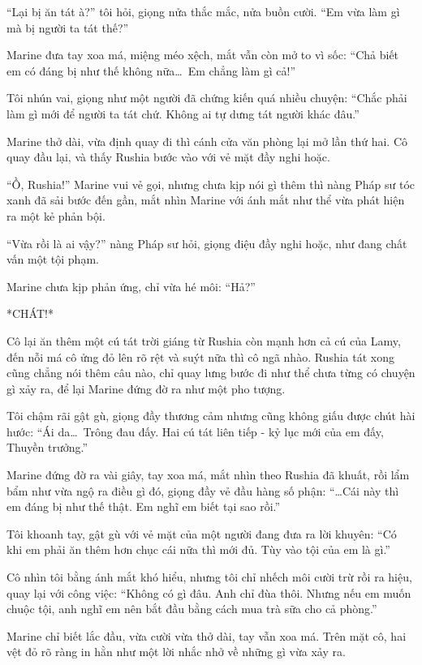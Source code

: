 \documentclass[../main.tex]{subfiles}
\begin{document}
``Lại bị ăn tát à?'' tôi hỏi, giọng nửa thắc mắc, nửa buồn cười. ``Em vừa làm gì mà bị người ta tát thế?''

Marine đưa tay xoa má, miệng méo xệch, mắt vẫn còn mở to vì sốc: ``Chả biết em có đáng bị như thế không nữa\dots\ Em chẳng làm gì cả!''

Tôi nhún vai, giọng như một người đã chứng kiến quá nhiều chuyện: ``Chắc phải làm gì mới để người ta tát chứ. Không ai tự dưng tát người khác đâu.''

Marine thở dài, vừa định quay đi thì cánh cửa văn phòng lại mở lần thứ hai. Cô quay đầu lại, và thấy Rushia bước vào với vẻ mặt đầy nghi hoặc.

``Ồ, Rushia!'' Marine vui vẻ gọi, nhưng chưa kịp nói gì thêm thì nàng Pháp sư tóc xanh đã sải bước đến gần, mắt nhìn Marine với ánh mắt như thể vừa phát hiện ra một kẻ phản bội.

``Vừa rồi là ai vậy?'' nàng Pháp sư hỏi, giọng điệu đầy nghi hoặc, như đang chất vấn một tội phạm.

Marine chưa kịp phản ứng, chỉ vừa hé môi: ``Hả?''

*CHÁT!*


Cô lại ăn thêm một cú tát trời giáng từ Rushia còn mạnh hơn cả cú của Lamy, đến nỗi má cô ửng đỏ lên rõ rệt và suýt nữa thì cô ngã nhào. Rushia tát xong cũng chẳng nói thêm câu nào, chỉ quay lưng bước đi như thể chưa từng có chuyện gì xảy ra, để lại Marine đứng đờ ra như một pho tượng.

Tôi chậm rãi gật gù, giọng đầy thương cảm nhưng cũng không giấu được chút hài hước: ``Ái da\dots\ Trông đau đấy. Hai cú tát liên tiếp - kỷ lục mới của em đấy, Thuyền trưởng.''

Marine đứng đờ ra vài giây, tay xoa má, mắt nhìn theo Rushia đã khuất, rồi lẩm bẩm như vừa ngộ ra điều gì đó, giọng đầy vẻ đầu hàng số phận: ``\dots  Cái này thì em đáng bị như thế thật. Em nghĩ em biết tại sao rồi.''


Tôi khoanh tay, gật gù với vẻ mặt của một người đang đưa ra lời khuyên: ``Có khi em phải ăn thêm hơn chục cái nữa thì mới đủ. Tùy vào tội của em là gì.''

Cô nhìn tôi bằng ánh mắt khó hiểu, nhưng tôi chỉ nhếch môi cười trừ rồi ra hiệu, quay lại với công việc: ``Không có gì đâu. Anh chỉ đùa thôi. Nhưng nếu em muốn chuộc tội, anh nghĩ em nên bắt đầu bằng cách mua trà sữa cho cả phòng.''

Marine chỉ biết lắc đầu, vừa cười vừa thở dài, tay vẫn xoa má. Trên mặt cô, hai vệt đỏ rõ ràng in hằn như một lời nhắc nhở về những gì vừa xảy ra.
\end{document}
